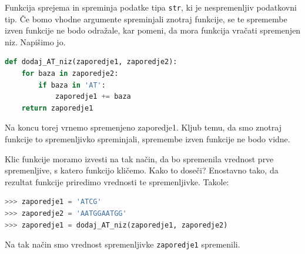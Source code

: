 \begin{resitev}
Funkcija sprejema in spreminja podatke tipa \texttt{str}, ki je nespremenljiv podatkovni tip. Če bomo vhodne argumente spreminjali znotraj funkcije, se te spremembe izven funkcije ne bodo odražale, kar pomeni, da mora funkcija vračati spremenjen niz. Napišimo jo.
\begin{lstlisting}[language=Python]
def dodaj_AT_niz(zaporedje1, zaporedje2):
    for baza in zaporedje2:
        if baza in 'AT':
            zaporedje1 += baza
    return zaporedje1
\end{lstlisting}
Na koncu torej vrnemo spremenjeno zaporedje1. Kljub temu, da smo znotraj funkcije to spremenljivko spreminjali, spremembe izven funkcije ne bodo vidne.

Klic funkcije moramo izvesti na tak način, da bo spremenila vrednost prve spremenljive, s katero funkcijo kličemo. Kako to doseči? Enostavno tako, da rezultat funkcije priredimo vrednosti te spremenljivke. Takole:
\begin{lstlisting}[language=Python]
>>> zaporedje1 = 'ATCG'
>>> zaporedje2 = 'AATGGAATGG'
>>> zaporedje1 = dodaj_AT_niz(zaporedje1, zaporedje2)
\end{lstlisting}
Na tak način smo vrednost spremenljivke \texttt{zaporedje1} spremenili.
\end{resitev}

